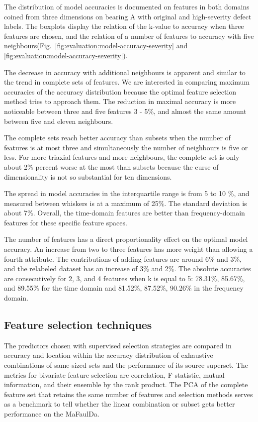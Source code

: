The distribution of model accuracies is documented on features in both domains coined from three dimensions on bearing A with original and high-severity defect labels. The boxplots display the relation of the k-value to accuracy when three features are chosen, and the relation of a number of features to accuracy with five neighbours(Fig.~\ref{fig:evaluation:model-accuracy-severity} and \ref{fig:evaluation:model-accuracy-severity}).

The decrease in accuracy with additional neighbours is apparent and similar to the trend in complete sets of features. We are interested in comparing maximum accuracies of the accuracy distribution because the optimal feature selection method tries to approach them. The reduction in maximal accuracy is more noticeable between three and five features 3 - 5\%, and almost the same amount between five and eleven neighbours. 

The complete sets reach better accuracy than subsets when the number of features is at most three and simultaneously the number of neighbours is five or less. For more triaxial features and more neighbours, the complete set is only about 2\% percent worse at the most than subsets because the curse of dimensionality is not so substantial for ten dimensions.

The spread in model accuracies in the interquartile range is from 5 to 10 \%, and measured between whiskers is at a maximum of 25\%. The standard deviation is about 7\%. Overall, the time-domain features are better than frequency-domain features for these specific feature spaces.

The number of features has a direct proportionality effect on the optimal model accuracy. An increase from two to three features has more weight than allowing a fourth attribute. The contributions of adding features are around 6\% and 3\%, and the relabeled dataset has an increase of 3\% and 2\%. The absolute accuracies are consecutively for 2, 3, and 4 features when k is equal to 5: 78.31\%, 85.67\%, and 89.55\% for the time domain and 81.52\%, 87.52\%, 90.26\% in the frequency domain.

\subsection{Feature selection techniques}
The predictors chosen with supervised selection strategies are compared in accuracy and location within the accuracy distribution of exhaustive combinations of same-sized sets and the performance of its source superset. The metrics for bivariate feature selection are correlation, F statistic, mutual information, and their ensemble by the rank product. The PCA of the complete feature set that retains the same number of features and selection methods serves as a benchmark to tell whether the linear combination or subset gets better performance on the MaFaulDa.

